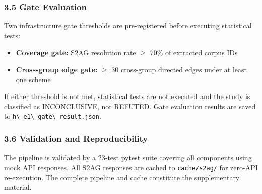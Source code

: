 \subsubsection{3.5 Gate Evaluation}

Two infrastructure gate thresholds are pre-registered before executing statistical tests:

\begin{itemize}
\item \textbf{Coverage gate:} S2AG resolution rate $\geq$ 70\% of extracted corpus IDs
\item \textbf{Cross-group edge gate:} $\geq$ 30 cross-group directed edges under at least one scheme
\end{itemize}

If either threshold is not met, statistical tests are not executed and the study is classified as INCONCLUSIVE, not REFUTED. Gate evaluation results are saved to \texttt{h\textbackslash \_e1\textbackslash \_gate\textbackslash \_result.json}.

\subsubsection{3.6 Validation and Reproducibility}

The pipeline is validated by a 23-test pytest suite covering all components using mock API responses. All S2AG responses are cached to \texttt{cache/s2ag/} for zero-API re-execution. The complete pipeline and cache constitute the supplementary material.

